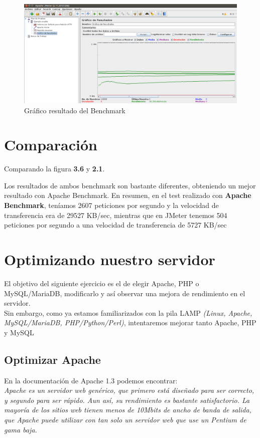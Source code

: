 \begin{figure}[h]
	\centering
	\includegraphics[scale=0.35]{images/grafico.png}
	\caption{Gráfico resultado del Benchmark}
\end{figure}

\newpage
\section*{Comparación}
Comparando la figura \textbf{3.6} y \textbf{2.1}.

Los resultados de ambos benchmark son bastante diferentes, obteniendo un mejor resultado con Apache Benchmark.
En resumen, en el test realizado con \textbf{Apache Benchmark}, teníamos 2607 peticiones por segundo y la velocidad de transferencia era de 29527 KB/sec, mientras que en JMeter tenemos 504 peticiones por segundo a una velocidad de transferencia de 5727 KB/sec 


\newpage
\section{Optimizando nuestro servidor}
El objetivo del siguiente ejercicio es el de elegir Apache, PHP o MySQL/MariaDB, modificarlo y así observar una mejora de rendimiento en el servidor. \\ Sin embargo, como ya estamos familiarizados con la pila LAMP  \textit{(Linux, Apache, MySQL/MariaDB, PHP/Python/Perl)}, intentaremos mejorar tanto Apache, PHP y MySQL

\subsection{Optimizar Apache}
En la documentación de Apache 1.3 podemos encontrar: \\

\textit{Apache es un servidor web genérico, que primero está diseñado para ser correcto, y segundo para ser rápido. Aun así, su rendimiento es bastante satisfactorio. La mayoría de los sitios web tienen menos de 10Mbits de ancho de banda de salida, que Apache puede utilizar con tan solo un servidor web que use un Pentium de gama baja.} \\

